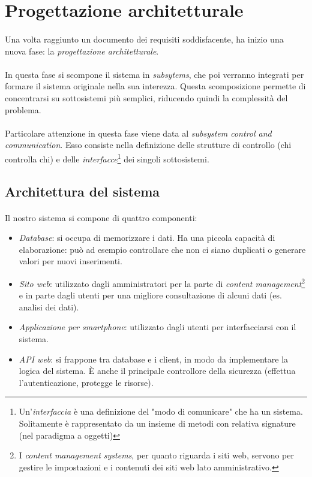 \documentclass[11pt,a4paper,english]{article}
\begin{document}
\section{Progettazione architetturale}

\paragraph{} Una volta raggiunto un documento dei requisiti soddisfacente, ha inizio una nuova fase: la \emph{progettazione architetturale}. 

\paragraph{} In questa fase si scompone il sistema in \emph{subsytems}, che poi verranno integrati per formare il sistema originale nella sua interezza. Questa scomposizione permette di concentrarsi su sottosistemi più semplici, riducendo quindi la complessità del problema. 

\paragraph{} Particolare attenzione in questa fase viene data al \emph{subsystem control and communication}. Esso consiste nella definizione delle strutture di controllo (chi controlla chi) e delle \emph{interfacce}\footnote{Un'\emph{interfaccia} è una definizione del "modo di comunicare" che ha un sistema. Solitamente è rappresentato da un insieme di metodi con relativa signature (nel paradigma a oggetti)} dei singoli sottosistemi.

\subsection{Architettura del sistema}

\paragraph{} Il nostro sistema si compone di quattro componenti:
\begin{itemize}
    \item \emph{Database}: si occupa di memorizzare i dati. Ha una piccola capacità di elaborazione: può ad esempio controllare che non ci siano duplicati o generare valori per nuovi inserimenti.
    \item \emph{Sito web}: utilizzato dagli amministratori per la parte di \emph{content management}\footnote{I \emph{content management systems}, per quanto riguarda i siti web, servono per gestire le impostazioni e i contenuti dei siti web lato amministrativo.} e in parte dagli utenti per una migliore consultazione di alcuni dati (es. analisi dei dati).
    \item \emph{Applicazione per smartphone}: utilizzato dagli utenti per interfacciarsi con il sistema.
    \item \emph{API web}: si frappone tra database e i client, in modo da implementare la logica del sistema. È anche il principale controllore della sicurezza (effettua l'autenticazione, protegge le risorse). 
\end{itemize}
\end{document}
